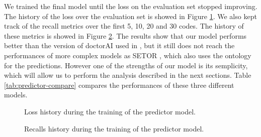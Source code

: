 \documentclass[]{marticle}
\begin{document}
We trained the final model until the loss on the evaluation set stopped improving. The history of
the loss over the evaluation set is showed in Figure \ref{fig:kelso-train-loss}. We also kept track
of the recall metrics over the first 5, 10, 20 and 30 codes. The history of these metrics is showed
in Figure \ref{fig:kelso-train-recall}. The results show that our model performs better than the
version of doctorAI used in \cite{panigutti-xai}, but it still does not reach the performances of
more complex models as SETOR \cite{setor-paper}, which also uses the ontology for the predictions.
However one of the strengths of our model is its semplicity, which will allow us to perform the
analysis described in the next sections. Table \ref{tab:predictor-compare} compares the performances
of these three different models.

\begin{figure}[!tb] 
\caption{Loss history during the training of the predictor model.} 
\label{fig:kelso-train-loss} 
\end{figure}

\begin{figure}[!tb] 
\caption{Recalls history during the training of the predictor model.}
\label{fig:kelso-train-recall} 
\end{figure}
\end{document}
